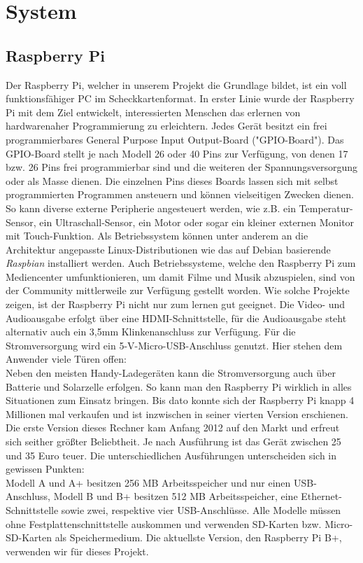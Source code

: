 \documentclass[journal]{IEEEtran}
\begin{document}
\section{System}
\subsection{Raspberry Pi}
Der Raspberry Pi, welcher in unserem Projekt die Grundlage bildet, ist ein voll funktionsfähiger PC im Scheckkartenformat. In erster Linie wurde der Raspberry Pi mit dem Ziel entwickelt, interessierten Menschen das erlernen von hardwarenaher Programmierung zu erleichtern. Jedes Gerät besitzt ein frei programmierbares General Purpose Input Output-Board ("GPIO-Board"). Das GPIO-Board stellt je nach Modell 26 oder 40 Pins zur Verfügung, von denen 17 bzw. 26 Pins frei programmierbar sind und die weiteren der Spannungsversorgung oder als Masse dienen. Die einzelnen Pins dieses Boards lassen sich mit selbst programmierten Programmen ansteuern und können vielseitigen Zwecken dienen. So kann diverse externe Peripherie angesteuert werden, wie z.B. ein Temperatur-Sensor, ein Ultraschall-Sensor, ein Motor oder sogar ein kleiner externen Monitor mit Touch-Funktion. Als Betriebssystem können unter anderem an die Architektur angepasste Linux-Distributionen wie das auf Debian basierende \textit{Raspbian} installiert werden.  Auch Betriebssysteme, welche den Raspberry Pi zum Mediencenter umfunktionieren, um damit Filme und Musik abzuspielen, sind von der Community mittlerweile zur Verfügung gestellt worden. Wie solche Projekte zeigen, ist der Raspberry Pi nicht nur zum lernen gut geeignet. Die Video- und Audioausgabe erfolgt über eine HDMI-Schnittstelle, für die Audioausgabe steht alternativ auch ein 3,5mm Klinkenanschluss zur Verfügung. Für die Stromversorgung wird ein 5-V-Micro-USB-Anschluss genutzt. Hier stehen dem Anwender viele Türen offen: \\ Neben den meisten Handy-Ladegeräten kann die Stromversorgung auch über Batterie und Solarzelle erfolgen. So kann man den Raspberry Pi wirklich in alles Situationen zum Einsatz bringen. Bis dato konnte sich der Raspberry Pi knapp 4 Millionen mal verkaufen und ist inzwischen in seiner vierten Version erschienen. \cite{verkaufszahlen} Die erste Version dieses Rechner kam Anfang 2012 auf den Markt und erfreut sich seither größter Beliebtheit. Je nach Ausführung ist das Gerät zwischen 25 und 35 Euro teuer. Die unterschiedlichen Ausführungen unterscheiden sich in gewissen Punkten: \\ Modell A und A+ besitzen 256 MB Arbeitsspeicher und nur einen USB-Anschluss, Modell B und B+ besitzen 512 MB Arbeitsspeicher, eine Ethernet-Schnittstelle sowie zwei, respektive vier USB-Anschlüsse. Alle Modelle müssen ohne Festplattenschnittstelle auskommen und verwenden SD-Karten  bzw. Micro-SD-Karten als Speichermedium. Die aktuellste Version, den Raspberry Pi B+, verwenden wir für dieses Projekt.\\
\end{document}

